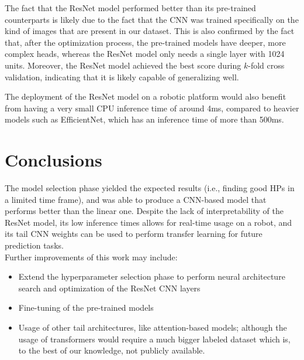 \noindent
The fact that the ResNet model performed better than its pre-trained counterparts is likely due to the fact that the CNN was trained specifically on the kind of images that are present in our dataset. This is also confirmed by the fact that, after the optimization process, the pre-trained models have deeper, more complex heads, whereas the ResNet model only needs a single layer with 1024 units. Moreover, the ResNet model achieved the best score during $k$-fold cross validation, indicating that it is likely capable of generalizing well.

The deployment of the ResNet model on a robotic platform would also benefit from having a very small CPU inference time of around 4ms, compared to heavier models such as EfficientNet, which has an inference time of more than 500ms.\\

\section{Conclusions}
The model selection phase yielded the expected results (i.e., finding good HPs in a limited time frame), and was able to produce a CNN-based model that performs better than the linear one. Despite the lack of interpretability of the ResNet model, its low inference times allows for real-time usage on a robot, and its tail CNN weights can be used to perform transfer learning for future prediction tasks.\\

\noindent
Further improvements of this work may include:

\begin{itemize}
    \item Extend the hyperparameter selection phase to perform neural architecture search and optimization of the ResNet CNN layers
    \item Fine-tuning of the pre-trained models
    \item Usage of other tail architectures, like attention-based models; although the usage of transformers would require a much bigger labeled dataset which is, to the best of our knowledge, not publicly available.  
\end{itemize}


